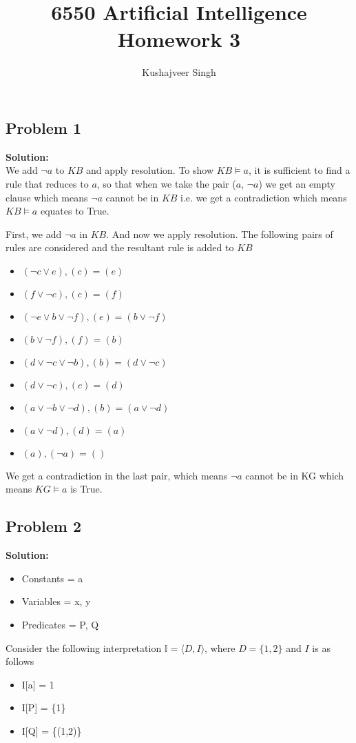 \documentclass[12pt,a4paper]{article}
\title{6550 Artificial Intelligence Homework 3}
\author{Kushajveer Singh}
\date{}
\newcommand{\solution}{\noindent\textbf{Solution:}\\\indent}
\begin{document}
\maketitle

\subsection*{Problem 1}
\solution
We add $\neg a$ to $KB$ and apply resolution. To show $KB \models a$, it is sufficient to find a rule that reduces to $a$, so that when we take the pair ($a$, $\neg a$) we get an empty clause which means $\neg a$ cannot be in $KB$ i.e. we get a contradiction which means $KB \models a$ equates to True.

First, we add $\neg a$ in $KB$. And now we apply resolution. The following pairs of rules are considered and the resultant rule is added to $KB$
\begin{itemize}
    \item $(\neg c \lor e), (c) = (e)$
    \item $(f \lor \neg c), (c) = (f)$
    \item $(\neg e \lor b \lor \neg f), (e) = (b \lor \neg f)$
    \item $(b \lor \neg f), (f) = (b)$
    \item $(d \lor \neg c \lor \neg b), (b) = (d \lor \neg c)$
    \item $(d \lor \neg c), (c) = (d)$
    \item $(a \lor \neg b \lor \neg d), (b) = (a \lor \neg d)$
    \item $(a \lor \neg d), (d) = (a)$
    \item $(a), (\neg a) = ()$
\end{itemize}

We get a contradiction in the last pair, which means $\neg a$ cannot be in KG which means $KG \models a$ is True.

\newpage
\subsection*{Problem 2}
\solution
\begin{itemize}
    \item Constants = a
    \item Variables = x, y
    \item Predicates = P, Q
\end{itemize}

Consider the following interpretation $\mathbb{I} = \langle D, I \rangle$, where $D = \{1, 2\}$ and $I$ is as follows
\begin{itemize}
    \item I[a] = 1
    \item I[P] = \{1\}
    \item I[Q] = \{(1,2)\}
\end{itemize}
\end{document}
